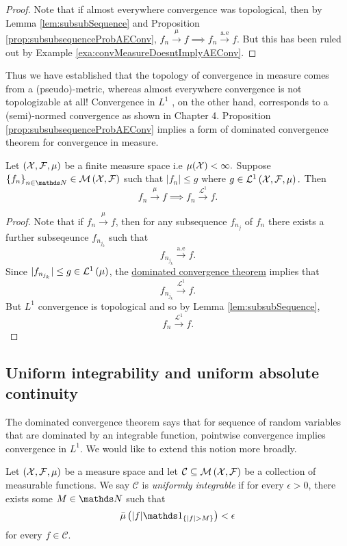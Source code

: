 \begin{proof}
Note that if almost everywhere convergence was topological, then by
Lemma \ref{lem:subsubSequence} and Proposition \ref{prop:subsubsequenceProbAEConv},
$f_{n}\stackrel{\mu}{\longrightarrow}f\implies f_{n}\stackrel{\text{a.e}}{\longrightarrow}f$.
But this has been ruled out by Example \ref{exa:convMeasureDoesntImplyAEConv}.
\end{proof}
Thus we have established that the topology of convergence in measure
comes from a (pseudo)-metric, whereas almost everywhere convergence
is not topologizable at all! Convergence in $L^{1}$ , on the other
hand, corresponds to a (semi)-normed convergence as shown in Chapter
4. Proposition \ref{prop:subsubsequenceProbAEConv} implies a form
of dominated convergence theorem for convergence in measure.
\begin{prop}
\label{prop:convMeasureDomConv}Let $\left(\mathcal{X},\mathcal{F},\mu\right)$ be a
finite measure space i.e $\mu(\mathcal{X})<\infty.$ Suppose $\left\{ f_{n}\right\} _{n\in\N}\in\measurableFunctions$
such that $\lvert f_{n}\rvert\leq g$ where $g\in\mathcal{L}^{1}\left(\mathcal{X},\mathcal{F},\mu\right).$
Then
\[
f_{n}\stackrel{\mu}{\longrightarrow}f\implies f_{n}\stackrel{\mathcal{L}^{1}}{\longrightarrow}f.
\]
\end{prop}

\begin{proof}
Note that if $f_{n}\stackrel{\mu}{\longrightarrow}f$, then for any
subsequence $f_{n_{j}}$ of $f_{n}$ there exists a further subseqeunce
$f_{n_{j_{k}}}$ such that 
\[
f_{n_{j_{k}}}\stackrel{\text{a.e}}{\longrightarrow}f.
\]
Since $\lvert f_{n_{j_{k}}}\rvert\leq g\in\mathcal{L}^{1}\left(\mu\right)$, the \hyperref[thm:generalizedDominatedConvergence]{dominated convergence theorem}
implies that 
\[
f_{n_{j_{k}}}\stackrel{\mathcal{L}^{1}}{\longrightarrow}f.
\]
But $L^{1}$ convergence is topological and so by Lemma \ref{lem:subsubSequence},
\[
f_{n}\stackrel{\mathcal{L}^{1}}{\longrightarrow}f.
\]
\end{proof}

\subsection{Uniform integrability and uniform absolute continuity}

The dominated convergence theorem says that for sequence of random
variables that are dominated by an integrable function, pointwise
convergence implies convergence in $L^{1}$. We would like to extend
this notion more broadly.
\begin{defn}
\label{def:uniformIntegrability}Let $\left(\mathcal{X},\mathcal{F},\mu\right)$ be
a measure space and let $\mathcal{C}\subseteq\mathcal{M}\left(\mathcal{X},\mathcal{F}\right)$
be a collection of measurable functions. We say $\mathcal{C}$ is
\emph{uniformly integrable }if for every $\epsilon>0$, there exists
some $M\in\N$ such that 
\[
\lebInt{\mu}{\lvert f\rvert\indicate_{\{\lvert f\rvert>M\}}}<\epsilon
\]
for every $f\in\mathcal{C}$.
\end{defn}

